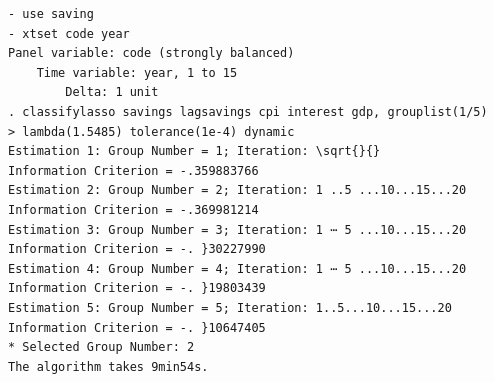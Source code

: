 \documentclass[10pt]{article}
\begin{document}
\begin{verbatim}
- use saving
- xtset code year
Panel variable: code (strongly balanced)
    Time variable: year, 1 to 15
        Delta: 1 unit
. classifylasso savings lagsavings cpi interest gdp, grouplist(1/5)
> lambda(1.5485) tolerance(1e-4) dynamic
Estimation 1: Group Number = 1; Iteration: \sqrt{}{}
Information Criterion = -.359883766
Estimation 2: Group Number = 2; Iteration: 1 ..5 ...10...15...20 
Information Criterion = -.369981214
Estimation 3: Group Number = 3; Iteration: 1 ⋯ 5 ...10...15...20 
Information Criterion = -. }30227990
Estimation 4: Group Number = 4; Iteration: 1 ⋯ 5 ...10...15...20 
Information Criterion = -. }19803439
Estimation 5: Group Number = 5; Iteration: 1..5...10...15...20 
Information Criterion = -. }10647405
* Selected Group Number: 2
The algorithm takes 9min54s.
\end{verbatim}
\end{document}
